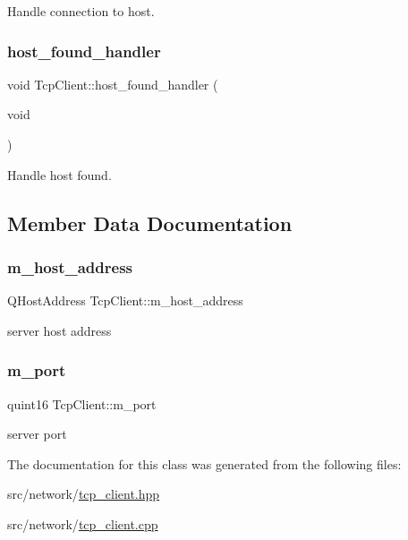 Handle connection to host. 

\mbox{\label{class_tcp_client_a2c1b8363f05d55bc06335f8da4c7fc8e}} 
\subsubsection{\texorpdfstring{host\_found\_handler}{host\_found\_handler}}
{\footnotesize\ttfamily void Tcp\+Client\+::host\+\_\+found\+\_\+handler (\begin{DoxyParamCaption}\item[{void}]{ }\end{DoxyParamCaption})\hspace{0.3cm}{\ttfamily [slot]}}



Handle host found. 



\subsection{Member Data Documentation}
\mbox{\label{class_tcp_client_acf0e0d339a1160852fd2ed2eaf4dce7f}} 
\subsubsection{\texorpdfstring{m\_host\_address}{m\_host\_address}}
{\footnotesize\ttfamily Q\+Host\+Address Tcp\+Client\+::m\+\_\+host\+\_\+address\hspace{0.3cm}{\ttfamily [private]}}

server host address \mbox{\label{class_tcp_client_a9c8dbdd8d4571d37bc774d17b627c2d5}} 
\subsubsection{\texorpdfstring{m\_port}{m\_port}}
{\footnotesize\ttfamily quint16 Tcp\+Client\+::m\+\_\+port\hspace{0.3cm}{\ttfamily [private]}}

server port 

The documentation for this class was generated from the following files\+:\begin{DoxyCompactItemize}
\item 
src/network/\mbox{\hyperlink{tcp__client_8hpp}{tcp\+\_\+client.\+hpp}}\item 
src/network/\mbox{\hyperlink{tcp__client_8cpp}{tcp\+\_\+client.\+cpp}}\end{DoxyCompactItemize}
